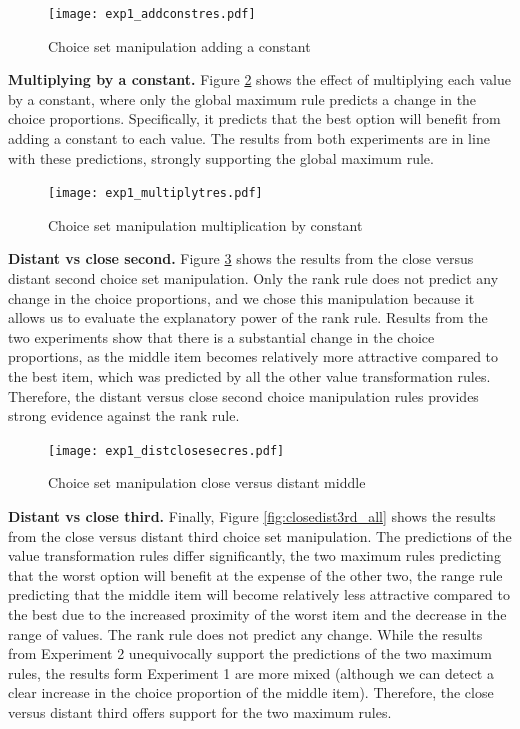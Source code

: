 \documentclass[11pt,a4paper]{article}
\begin{document}
\begin{figure}[!htb]
\captionsetup{justification=centering}
\centering
\caption{Choice set manipulation adding a constant}
\texttt{[image: exp1\_addconstres.pdf]}
\label{fig:addconstant_all}
\end{figure}

\textbf{Multiplying by a constant.} Figure \ref{fig:multiply_all} shows the effect of multiplying each value by a constant, where only the global maximum rule predicts a change in the choice proportions. Specifically, it predicts that the best option will benefit from adding a constant to each value. The results from both experiments are in line with these predictions, strongly supporting the global maximum rule.

\begin{figure}[!htb]
\captionsetup{justification=centering}
\centering
\caption{Choice set manipulation multiplication by constant}
\texttt{[image: exp1\_multiplytres.pdf]}
\label{fig:multiply_all}
\end{figure}

\textbf{Distant vs close second.} Figure \ref{fig:distclose2nd_all} shows the results from the close versus distant second choice set manipulation. Only the rank rule does not predict any change in the choice proportions, and we chose this manipulation because it allows us to evaluate the explanatory power of the rank rule. Results from the two experiments show that there is a substantial change in the choice proportions, as the middle item becomes relatively more attractive compared to the best item, which was predicted by all the other value transformation rules. Therefore, the distant versus close second choice manipulation rules provides strong evidence against the rank rule. 


\begin{figure}[!htb]
\captionsetup{justification=centering}
\centering
\caption{Choice set manipulation close versus distant middle}
\texttt{[image: exp1\_distclosesecres.pdf]}
\label{fig:distclose2nd_all}
\end{figure}

\textbf{Distant vs close third.} Finally, Figure \ref{fig:closedist3rd_all} shows the results from the close versus distant third choice set manipulation. The predictions of the value transformation rules differ significantly, the two maximum rules predicting that the worst option will benefit at the expense of the other two, the range rule predicting that the middle item will become relatively less attractive compared to the best due to the increased proximity of the worst item and the decrease in the range of values. The rank rule does not predict any change.  While the results from Experiment 2 unequivocally support the predictions of the two maximum rules, the results form Experiment 1 are more mixed (although we can detect a clear increase in the choice proportion of the  middle item). Therefore, the close versus distant third offers support for the two maximum rules.
\end{document}
